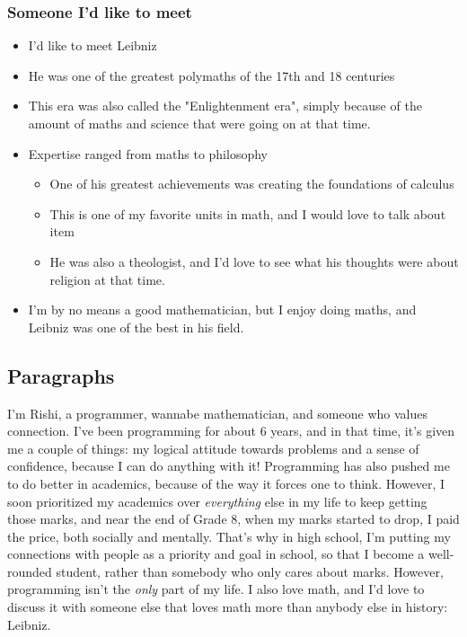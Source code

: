 \documentclass[]{article}
\begin{document}
\subsubsection*{Someone I'd like to meet}
\begin{itemize}
    \item I'd like to meet Leibniz
    \item He was one of the greatest polymaths of the 17th and 18 centuries
    \item This era was also called the "Enlightenment era", simply because of the amount of maths and science that were going on at that time.
    \item Expertise ranged from maths to philosophy
    \begin{itemize}
        \item One of his greatest achievements was creating the foundations of calculus
        \item This is one of my favorite units in math, and I would love to talk about item
        \item He was also a theologist, and I'd love to see what his thoughts were about religion at that time.
    \end{itemize}
    \item I'm by no means a good mathematician, but I enjoy doing maths, and Leibniz was one of the best in his field.
\end{itemize}

\subsection*{Paragraphs}
I'm Rishi, a programmer, wannabe mathematician, and someone who values connection. I've been programming for about 6 years, and in that time, it's given me a couple of things: my logical attitude towards problems and a sense of confidence, because I can do anything with it! Programming has also pushed me to do better in academics, because of the way it forces one to think. However, I soon prioritized my academics over \textit{everything} else in my life to keep getting those marks, and near the end of Grade 8, when my marks started to drop, I paid the price, both socially and mentally. That's why in high school, I'm putting my connections with people as a priority and goal in school, so that I become a well-rounded student, rather than somebody who only cares about marks. However, programming isn't the \textit{only} part of my life. I also love math, and I'd love to discuss it with someone else that loves math more than anybody else in history: Leibniz.
\end{document}
